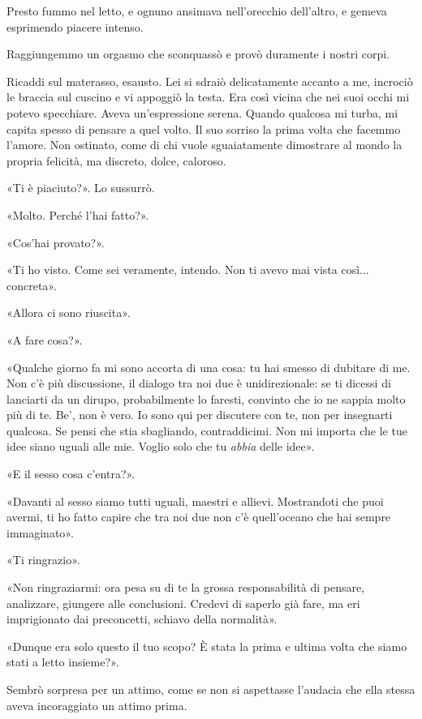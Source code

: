 \documentclass[a4paper,12pt]{book}
\begin{document}
Presto fummo nel letto, e ognuno ansimava nell'orecchio dell'altro, e gemeva
esprimendo piacere intenso.

Raggiungemmo un orgasmo che sconquassò e provò duramente i nostri corpi.

Ricaddi sul materasso, esausto. Lei si sdraiò delicatamente accanto a me,
incrociò le braccia sul cuscino e vi appoggiò la testa. Era così vicina che nei
suoi occhi mi potevo specchiare. Aveva un'espressione serena. Quando qualcosa mi
turba, mi capita spesso di pensare a quel volto. Il suo sorriso la prima volta
che facemmo l'amore. Non ostinato, come di chi vuole sguaiatamente dimostrare al
mondo la propria felicità, ma discreto, dolce, caloroso.

«Ti è piaciuto?». Lo sussurrò.

«Molto. Perché l'hai fatto?».

«Cos'hai provato?».

«Ti ho visto. Come sei veramente, intendo. Non ti avevo mai vista così...
concreta».

«Allora ci sono riuscita».

«A fare cosa?».

«Qualche giorno fa mi sono accorta di una cosa: tu hai smesso di dubitare di me.
Non c'è più discussione, il dialogo tra noi due è unidirezionale: se ti dicessi
di lanciarti da un dirupo, probabilmente lo faresti, convinto che io ne sappia
molto più di te. Be', non è vero. Io sono qui per discutere con te, non per
insegnarti qualcosa. Se pensi che stia sbagliando, contraddicimi. Non mi importa
che le tue idee siano uguali alle mie. Voglio solo che tu \emph{abbia} delle
idee».

«E il sesso cosa c'entra?».

«Davanti al sesso siamo tutti uguali, maestri e allievi. Mostrandoti che puoi
avermi, ti ho fatto capire che tra noi due non c'è quell'oceano che hai sempre
immaginato».

«Ti ringrazio».

«Non ringraziarmi: ora pesa su di te la grossa responsabilità di pensare,
analizzare, giungere alle conclusioni. Credevi di saperlo già fare, ma eri
imprigionato dai preconcetti, schiavo della normalità».

«Dunque era solo questo il tuo scopo? È stata la prima e ultima volta che siamo
stati a letto insieme?».

Sembrò sorpresa per un attimo, come se non si aspettasse l'audacia che ella
stessa aveva incoraggiato un attimo prima.
\end{document}
